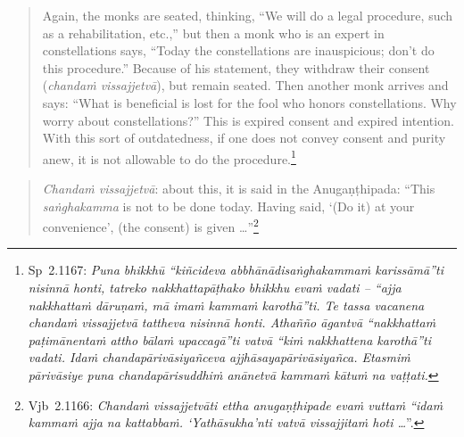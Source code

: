 \documentclass[12pt,openany]{book}%
\begin{document}
\begin{quotation}%
Again, the monks are seated, thinking, “We will do a legal procedure, such as a rehabilitation, etc.,” but then a monk who is an expert in constellations says, “Today the constellations are inauspicious; don’t do this procedure.” Because of his statement, they withdraw their consent (\textit{\textsanskrit{chandaṁ} \textsanskrit{vissajjetvā}}), but remain seated. Then another monk arrives and says: “What is beneficial is lost for the fool who honors constellations. Why worry about constellations?” This is expired consent and expired intention. With this sort of outdatedness, if one does not convey consent and purity anew, it is not allowable to do the procedure.\footnote{Sp 2.1167: \textit{Puna \textsanskrit{bhikkhū} “\textsanskrit{kiñcideva} \textsanskrit{abbhānādisaṅghakammaṁ} \textsanskrit{karissāmā}”ti \textsanskrit{nisinnā} honti, tatreko \textsanskrit{nakkhattapāṭhako} bhikkhu \textsanskrit{evaṁ} vadati – “ajja \textsanskrit{nakkhattaṁ} \textsanskrit{dāruṇaṁ}, \textsanskrit{mā} \textsanskrit{imaṁ} \textsanskrit{kammaṁ} \textsanskrit{karothā}”ti. Te tassa vacanena \textsanskrit{chandaṁ} \textsanskrit{vissajjetvā} tattheva \textsanskrit{nisinnā} honti. \textsanskrit{Athañño} \textsanskrit{āgantvā} “\textsanskrit{nakkhattaṁ} \textsanskrit{paṭimānentaṁ} attho \textsanskrit{bālaṁ} \textsanskrit{upaccagā}”ti \textsanskrit{vatvā} “\textsanskrit{kiṁ} nakkhattena \textsanskrit{karothā}”ti vadati. \textsanskrit{Idaṁ} \textsanskrit{chandapārivāsiyañceva} \textsanskrit{ajjhāsayapārivāsiyañca}. \textsanskrit{Etasmiṁ} \textsanskrit{pārivāsiye} puna \textsanskrit{chandapārisuddhiṁ} \textsanskrit{anānetvā} \textsanskrit{kammaṁ} \textsanskrit{kātuṁ} na \textsanskrit{vaṭṭati}.} }

%
\end{quotation}

\begin{quotation}%
\textit{\textsanskrit{Chandaṁ} \textsanskrit{vissajjetvā}}: about this, it is said in the \textsanskrit{Anugaṇṭhipada}: “This \textit{\textsanskrit{saṅghakamma}} is not to be done today. Having said, ‘(Do it) at your convenience’, (the consent) is given …”\footnote{Vjb 2.1166: \textit{\textsanskrit{Chandaṁ} \textsanskrit{vissajjetvāti} ettha \textsanskrit{anugaṇṭhipade} \textsanskrit{evaṁ} \textsanskrit{vuttaṁ} “\textsanskrit{idaṁ} \textsanskrit{kammaṁ} ajja na \textsanskrit{kattabbaṁ}. ‘\textsanskrit{Yathāsukha}’nti \textsanskrit{vatvā} \textsanskrit{vissajjitaṁ} hoti …}”. }

%
\end{quotation}
\end{document}
